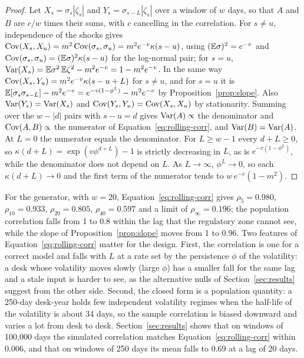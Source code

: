 \begin{proof}
Let $X_s=\sigma_s|\zeta_s|$ and $Y_s=\sigma_{s-L}|\zeta_s|$ over a window of $w$ days, so that $A$ and $B$ are $c/w$ times their sums, with $c$ cancelling in the correlation.
For $s\ne u$, independence of the shocks gives $\operatorname{Cov}(X_s,X_u)=m^2\operatorname{Cov}(\sigma_s,\sigma_u)=m^2e^{-v}\kappa(s-u)$, using $(\mathbb{E}\sigma)^2=e^{-v}$ and $\operatorname{Cov}(\sigma_s,\sigma_u)=(\mathbb{E}\sigma)^2\kappa(s-u)$ for the log-normal pair; for $s=u$, $\operatorname{Var}(X_s)=\mathbb{E}\sigma^2\,\mathbb{E}\zeta^2-m^2e^{-v}=1-m^2e^{-v}$.
In the same way $\operatorname{Cov}(X_s,Y_u)=m^2e^{-v}\kappa(s-u+L)$ for $s\ne u$, and for $s=u$ it is $\mathbb{E}[\sigma_s\sigma_{s-L}]-m^2e^{-v}=e^{-v(1-\phi^{L})}-m^2e^{-v}$ by Proposition~\ref{prop:slope}.
Also $\operatorname{Var}(Y_s)=\operatorname{Var}(X_s)$ and $\operatorname{Cov}(Y_s,Y_u)=\operatorname{Cov}(X_s,X_u)$ by stationarity.
Summing over the $w-|d|$ pairs with $s-u=d$ gives $\operatorname{Var}(A)\propto$ the denominator and $\operatorname{Cov}(A,B)\propto$ the numerator of Equation~\eqref{eq:rolling-corr}, and $\operatorname{Var}(B)=\operatorname{Var}(A)$.
At $L=0$ the numerator equals the denominator.
For $L\ge w-1$ every $d+L\ge0$, so $\kappa(d+L)=\exp(v\phi^{d+L})-1$ is strictly decreasing in $L$, as is $e^{-v(1-\phi^{L})}$, while the denominator does not depend on $L$.
As $L\to\infty$, $\phi^{L}\to0$, so each $\kappa(d+L)\to0$ and the first term of the numerator tends to $w\,e^{-v}(1-m^2)$.
\end{proof}

For the generator, with $w=20$, Equation~\eqref{eq:rolling-corr} gives $\rho_{5}=0.980$, $\rho_{10}=0.933$, $\rho_{20}=0.805$, $\rho_{40}=0.597$ and a limit of $\rho_\infty=0.196$; the population correlation falls from 1 to 0.8 within the lag that the regulatory zone cannot see, while the slope of Proposition~\ref{prop:slope} moves from 1 to 0.96.
Two features of Equation~\eqref{eq:rolling-corr} matter for the design.
First, the correlation is one for a correct model and falls with $L$ at a rate set by the persistence $\phi$ of the volatility: a desk whose volatility moves slowly (large $\phi$) has a smaller fall for the same lag and a stale input is harder to see, as the alternative nulls of Section~\ref{sec:results} suggest from the other side.
Second, the closed form is a population quantity: a 250-day desk-year holds few independent volatility regimes when the half-life of the volatility is about 34 days, so the sample correlation is biased downward and varies a lot from desk to desk.
Section~\ref{sec:results} shows that on windows of 100,000 days the simulated correlation matches Equation~\eqref{eq:rolling-corr} within 0.006, and that on windows of 250 days its mean falls to 0.69 at a lag of 20 days.

